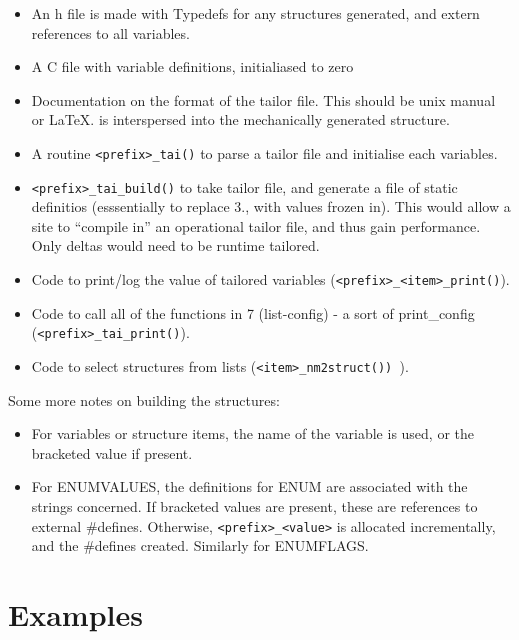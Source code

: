\begin {itemize}
\item
An h file is made with 
Typedefs for any structures generated, and 
extern references to all variables.


\item
A C file with variable definitions, initialiased to zero


\item
Documentation on the format of the tailor file.  This should be unix manual
or LaTeX.  {\tt <global-comment>} is interspersed into the mechanically
generated structure.

\item A routine {\tt <prefix>\_tai()} to parse a tailor file and initialise
each variables.

\item {\tt <prefix>\_tai\_build()} to take 
tailor file, and generate a file of static definitios
(esssentially to replace 3., with values frozen in).  This would allow a
site to ``compile in'' an operational tailor file, and thus gain performance.
Only deltas would need to be runtime tailored.  

\item Code to print/log the value of tailored variables ({\tt <prefix>\_<item>\_print()}).

\item Code to call all of the functions in 7 (list-config) - a sort of
print\_config ({\tt <prefix>\_tai\_print()}).

\item  
Code to select structures from lists 
 ({\tt  <item>\_nm2struct()) }).

\end {itemize}

Some more notes on building the structures:

\begin {itemize}
\item For variables or structure items, the name of the variable is used, or
the bracketed value if present.

\item For ENUMVALUES, the definitions for ENUM are associated with the
strings concerned.  If bracketed values are present, these are references to
external \#defines.  Otherwise, {\tt <prefix>\_<value>} is allocated
incrementally, and the \#defines created.
Similarly for ENUMFLAGS.  
\end {itemize}


\section {Examples}

